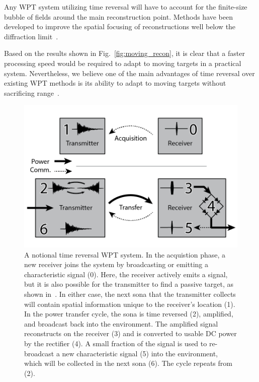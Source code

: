 Any WPT system utilizing time reversal will have to account for the
finite-size bubble of fields around the main reconstruction point.
Methods have been developed to improve the spatial focusing of reconstructions
well below the diffraction limit~\cite{lerosey-focusing}.

Based on the results shown in Fig.~\ref{fig:moving_recon}, it is clear that a faster
processing speed would be required to adapt to moving targets in a practical system.
%
Nevertheless, we believe one of the main advantages of time reversal over
existing WPT methods is its ability to adapt to moving targets without sacrificing
range~\cite{fink,nltr-wave-chaotic}.


\begin{figure}[t]
\includegraphics[width=\columnwidth]{figs/WPTSysAlt}
\caption{A notional time reversal WPT system. In the acquistion phase, a new receiver joins the system by broadcasting or emitting a characteristic signal (0). Here, the receiver actively emits a signal, but it is also possible for the transmitter to find a passive target, as shown in~\cite{nltr-wave-chaotic}. In either case, the next sona that the transmitter collects will contain spatial information unique to the receiver's location (1). In the power transfer cycle, the sona is time reversed (2), amplified, and broadcast back into the environment. The amplified signal reconstructs on the receiver (3) and is converted to usable DC power by the rectifier (4). A small fraction of the signal is used to re-broadcast a new characteristic signal (5) into the environment, which will be collected in the next sona (6). The cycle repeats from (2).}
\label{fig:SysImage}
\end{figure}

